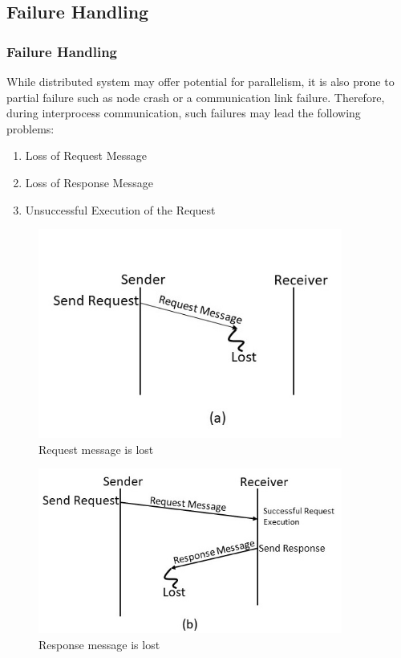 \documentclass{beamer}
\begin{document}
\subsection{Failure Handling}
\begin{frame}[allowframebreaks]
	\frametitle{ Failure Handling}
	While distributed system may offer potential for parallelism, it is also prone to
	partial failure such as node crash or a communication link failure. Therefore, during
	interprocess communication, such failures may lead the following problems:
	\begin{enumerate}
		\item Loss of Request Message
		\item Loss of Response Message
		\item Unsuccessful Execution of the Request
	\end{enumerate}	
	\framebreak
	\begin{figure}
		\centering
		\includegraphics[width=10cm]{fig36(a).jpg}
		\caption{Request message is lost}
	\end{figure}
	\framebreak	
	\begin{figure}
		\centering
		\includegraphics[width=10cm]{fig36(b).jpg}
		\caption{Response message is lost}
	\end{figure}
	\framebreak	
	\begin{figure}

\end{figure}
\end{frame}
\end{document}
